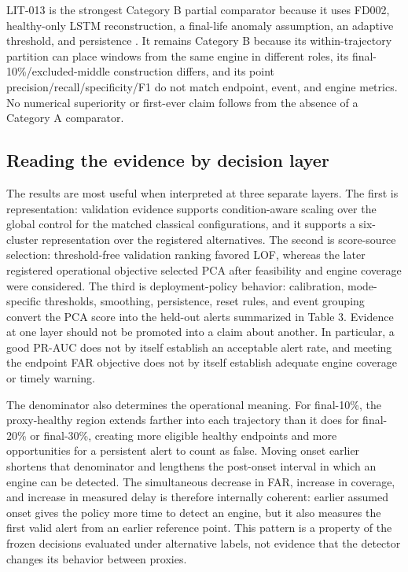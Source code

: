 \documentclass[11pt]{article}
\begin{document}
LIT-013 is the strongest Category B partial comparator because it uses FD002, healthy-only LSTM reconstruction, a final-life anomaly assumption, an adaptive threshold, and persistence \citep{core013}. It remains Category B because its within-trajectory partition can place windows from the same engine in different roles, its final-10\%/excluded-middle construction differs, and its point precision/recall/specificity/F1 do not match endpoint, event, and engine metrics. No numerical superiority or first-ever claim follows from the absence of a Category A comparator.


\subsection{Reading the evidence by decision layer}


The results are most useful when interpreted at three separate layers. The first is representation: validation evidence supports condition-aware scaling over the global control for the matched classical configurations, and it supports a six-cluster representation over the registered alternatives. The second is score-source selection: threshold-free validation ranking favored LOF, whereas the later registered operational objective selected PCA after feasibility and engine coverage were considered. The third is deployment-policy behavior: calibration, mode-specific thresholds, smoothing, persistence, reset rules, and event grouping convert the PCA score into the held-out alerts summarized in Table 3. Evidence at one layer should not be promoted into a claim about another. In particular, a good PR-AUC does not by itself establish an acceptable alert rate, and meeting the endpoint FAR objective does not by itself establish adequate engine coverage or timely warning.


The denominator also determines the operational meaning. For final-10\%, the proxy-healthy region extends farther into each trajectory than it does for final-20\% or final-30\%, creating more eligible healthy endpoints and more opportunities for a persistent alert to count as false. Moving onset earlier shortens that denominator and lengthens the post-onset interval in which an engine can be detected. The simultaneous decrease in FAR, increase in coverage, and increase in measured delay is therefore internally coherent: earlier assumed onset gives the policy more time to detect an engine, but it also measures the first valid alert from an earlier reference point. This pattern is a property of the frozen decisions evaluated under alternative labels, not evidence that the detector changes its behavior between proxies.
\end{document}
